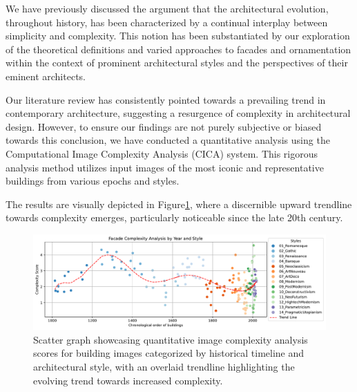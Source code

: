 %    

We have previously discussed the argument that the architectural evolution, throughout history, has been characterized by a continual interplay between simplicity and complexity.
This notion has been substantiated by our exploration of the theoretical definitions and varied approaches to facades and ornamentation within the context of prominent architectural styles and the perspectives of their eminent architects.

Our literature review has consistently pointed towards a prevailing trend in contemporary architecture, suggesting a resurgence of complexity in architectural design.
However, to ensure our findings are not purely subjective or biased towards this conclusion, we have conducted a quantitative analysis using the Computational Image Complexity Analysis (CICA) system.
This rigorous analysis method utilizes input images of the most iconic and representative buildings from various epochs and styles.

The results are visually depicted in Figure\ref{fig:complexitygraph}, where a discernible upward trendline towards complexity emerges, particularly noticeable since the late 20th century.

     \begin{figure}[!htb]
          \centering
          \includegraphics[width= \linewidth]{Graphs/complexitygraph}
          \caption{Scatter graph showcasing quantitative image complexity analysis scores for building images categorized by historical timeline and architectural style, with an overlaid trendline highlighting the evolving trend towards increased complexity.}
          \label{fig:complexitygraph}
     \end{figure}








